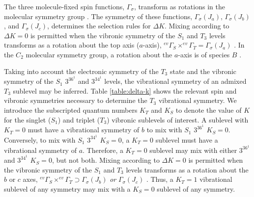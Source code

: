 The three molecule-fixed spin functions, $\Gamma_{\sigma}$, transform
as rotations in the molecular symmetry group \cite{hougen64,
  stevens73}.  The symmetry of these functions,
$\Gamma_{\sigma}(J_a)$, $\Gamma_{\sigma}(J_b)$, and
$\Gamma_{\sigma}(J_c)$, determines the selection rules for $\Delta K$.
Mixing according to $\Delta K =0$ is permitted when the vibronic
symmetry of the $S_1$ and $T_3$ levels transforms as a rotation about
the top axis ($a$-axis), $^{ev}\Gamma_S \times ^{ev}\Gamma_T =
\Gamma_{\sigma}( J_a)$ \cite{stevens73}.  In the $C_2$ molecular
symmetry group, a rotation about the $a$-axis is of species $B$
\cite{bunker98}.

Taking into account the electronic symmetry of the $T_3$ state and the
vibronic symmetry of the $S_1$ $3^36^1$ and $3^34^1$ levels, the
vibrational symmetry of an admixed $T_3$ sublevel may be inferred.
Table \ref{table:delta-k} shows the relevant spin and vibronic
symmetries necessary to determine the $T_3$ vibrational symmetry. We
introduce the subscripted quantum numbers $K_T$ and $K_S$ to denote
the value of $K$ for the singlet ($S_1$) and triplet ($T_3$) vibronic
sublevels of interest.  A sublevel with $K_T=0$ must have a
vibrational symmetry of $b$ to mix with $S_1$ $3^36^1$ $K_S=0$.
Conversely, to mix with $S_1$ $3^34^1$ $K_S=0$, a $K_T=0$ sublevel
must have a vibrational symmetry of $a$.  Therefore, a $K_T=0$
sublevel may mix with either $3^36^1$ and $3^34^1$ $K_S=0$, but not
both.  Mixing according to $\Delta K =0$ is permitted when the
vibronic symmetry of the $S_1$ and $T_3$ levels transforms as a
rotation about the $b$ or $c$ axes, $^{ev}\Gamma_S \times
^{ev}\Gamma_T \supset \Gamma_{\sigma}(J_b)$ \emph{or} $\Gamma_{\sigma}(J_c)$
\cite{stevens73}.  Thus, a $K_T=1$ vibrational sublevel of any
symmetry may mix with a $K_S=0$ sublevel of any symmetry.

